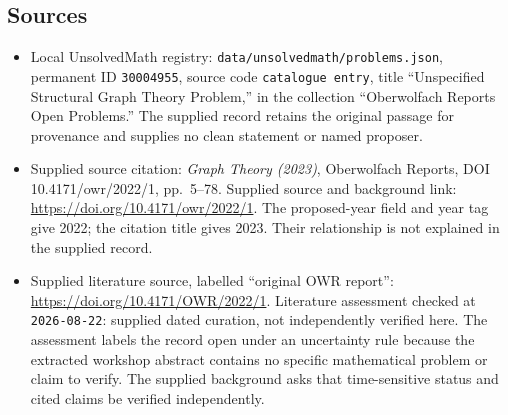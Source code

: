 \documentclass[11pt]{article}
\begin{document}
\subsection{Sources}
\begin{itemize}
\item Local UnsolvedMath registry: \texttt{data/unsolvedmath/problems.json}, permanent ID \texttt{30004955}, source code \texttt{catalogue entry}, title ``Unspecified Structural Graph Theory Problem,'' in the collection ``Oberwolfach Reports Open Problems.'' The supplied record retains the original passage for provenance and supplies no clean statement or named proposer.
\item Supplied source citation: \emph{Graph Theory (2023)}, Oberwolfach Reports, DOI 10.4171/owr/2022/1, pp.\ 5--78. Supplied source and background link: \url{https://doi.org/10.4171/owr/2022/1}. The proposed-year field and year tag give 2022; the citation title gives 2023. Their relationship is not explained in the supplied record.
\item Supplied literature source, labelled ``original OWR report'': \url{https://doi.org/10.4171/OWR/2022/1}. Literature assessment checked at \texttt{2026-08-22}: supplied dated curation, not independently verified here. The assessment labels the record open under an uncertainty rule because the extracted workshop abstract contains no specific mathematical problem or claim to verify. The supplied background asks that time-sensitive status and cited claims be verified independently.
\end{itemize}
\end{document}
